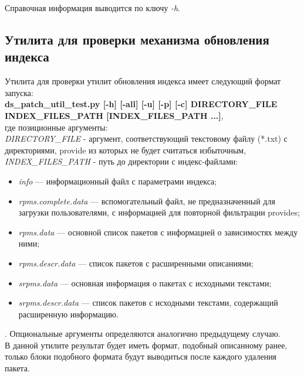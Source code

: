 Справочная информация выводится по ключу \emph{-h}.\\

\subsection{Утилита для проверки механизма обновления индекса}
Утилита для проверки утилит обновления индекса имеет следующий формат запуска:\\
\textbf{ds\_patch\_util\_test.py [-h] [-all] [-u] [-p] [-c] DIRECTORY\_FILE INDEX\_FILES\_PATH [INDEX\_FILES\_PATH ...]},\\
 где
позиционные аргументы:\\
\emph{DIRECTORY\_FILE} - аргумент, соответствующий текстовому файлу (*.txt) с 
директориями, provide из которых не будет считаться избыточным,\\
\emph{INDEX\_FILES\_PATH} - путь до директории с индекс-файлами: \\
\begin{itemize}
\item{\textit{info} --- информационный файл с параметрами индекса;} 
\item{\textit{rpms.complete.data} --- вспомогательный файл, не предназначенный
для загрузки пользователями, с информацией для повторной фильтрации
provides;}
\item{\textit{rpms.data} --- основной список пакетов с информацией о зависимостях между ними;}
\item{\textit{rpms.descr.data} --- список пакетов с расширенными описаниями;}
\item{\textit{srpms.data} --- основная информация о пакетах с исходными текстами;}
\item{\textit{srpms.descr.data} --- список пакетов с исходными текстами, содержащий
расширенную информацию.}
\end{itemize}.
Опциональные аргументы определяются аналогично предыдущему случаю. \\
В данной утилите результат будет иметь  формат, подобный описанному ранее, 
только блоки подобного формата будут выводиться после каждого удаления пакета.


